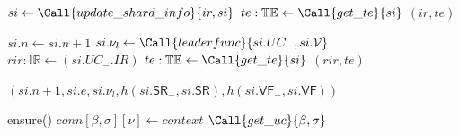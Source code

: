 \begin{algorithm}
  \caption{Certification helper functions}\label{alg:cert-helpers}
  \begin{algorithmic}[0]
      \State $si \gets \Call{update\_shard\_info}{ir, si}$
      \State {}
      \State $te: \mathbb{TE} \gets \Call{get\_te}{si}$
      \State \Return $(ir, te)$
    \EndFunction

      \State $si.n \gets si.n+1$  
      \State $si.\nu_l \gets \Call{leaderfunc}{si.UC_-, si.\mathcal{V}}$
      \State $rir: \mathbb{IR} \gets (si.UC_-.IR)$  
      \State $te: \mathbb{TE} \gets \Call{get\_te}{si}$
      \State \Return $(rir, te)$
    \EndFunction

      \State \Return $(si.n+1, si.e, si.\nu_l, h(si.\mathsf{SR}_-, si.\mathsf{SR}), h(si.\mathsf{VF}_-, si.\mathsf{VF}))$
    \EndFunction
  \end{algorithmic}
\end{algorithm}

\begin{algorithm}
  \caption{``SubscriptionMsg'' subscribes to UC feed}\label{alg:ping}
  \begin{algorithmic}[0]
      \State ensure()
      \State $conn[\beta, \sigma][\nu] \gets context$         
      \State \Return $\Call{get\_uc}{\beta, \sigma}$
    \EndMessage
  \end{algorithmic}
\end{algorithm}


